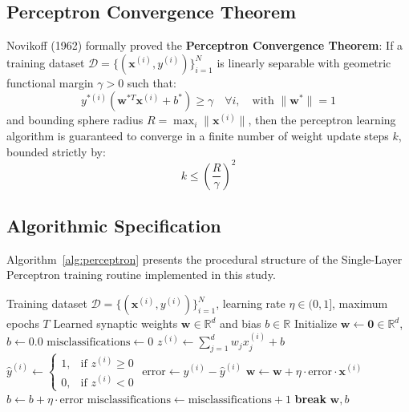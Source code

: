 \documentclass[12pt]{article}
\begin{document}
\subsection{Perceptron Convergence Theorem}
Novikoff (1962) formally proved the \textbf{Perceptron Convergence Theorem}: If a training dataset $\mathcal{D} = \{(\mathbf{x}^{(i)}, y^{(i)})\}_{i=1}^N$ is linearly separable with geometric functional margin $\gamma > 0$ such that:
\begin{equation}
    y^{*(i)} (\mathbf{w}^{*T} \mathbf{x}^{(i)} + b^*) \ge \gamma \quad \forall i, \quad \text{with } \|\mathbf{w}^*\| = 1
\end{equation}
and bounding sphere radius $R = \max_{i} \|\mathbf{x}^{(i)}\|$, then the perceptron learning algorithm is guaranteed to converge in a finite number of weight update steps $k$, bounded strictly by:
\begin{equation}
    k \le \left( \frac{R}{\gamma} \right)^2
\end{equation}

\subsection{Algorithmic Specification}
Algorithm~\ref{alg:perceptron} presents the procedural structure of the Single-Layer Perceptron training routine implemented in this study.

\begin{algorithm}[H]
\caption{Single-Layer Perceptron Learning Algorithm}
\label{alg:perceptron}
\begin{algorithmic}[1]
\Require Training dataset $\mathcal{D} = \{(\mathbf{x}^{(i)}, y^{(i)})\}_{i=1}^N$, learning rate $\eta \in (0, 1]$, maximum epochs $T$
\Ensure Learned synaptic weights $\mathbf{w} \in \mathbb{R}^d$ and bias $b \in \mathbb{R}$
\State Initialize $\mathbf{w} \leftarrow \mathbf{0} \in \mathbb{R}^d$, $b \leftarrow 0.0$
    \State $\text{misclassifications} \leftarrow 0$
        \State $z^{(i)} \leftarrow \sum_{j=1}^{d} w_j x_j^{(i)} + b$
        \State $\hat{y}^{(i)} \leftarrow \begin{cases} 1, & \text{if } z^{(i)} \ge 0 \\ 0, & \text{if } z^{(i)} < 0 \end{cases}$
        \State $\text{error} \leftarrow y^{(i)} - \hat{y}^{(i)}$
            \State $\mathbf{w} \leftarrow \mathbf{w} + \eta \cdot \text{error} \cdot \mathbf{x}^{(i)}$
            \State $b \leftarrow b + \eta \cdot \text{error}$
            \State $\text{misclassifications} \leftarrow \text{misclassifications} + 1$
        \EndIf
    \EndFor
        \State \textbf{break} 
    \EndIf
\EndFor
\State \Return $\mathbf{w}, b$
\end{algorithmic}
\end{algorithm}
\end{document}
